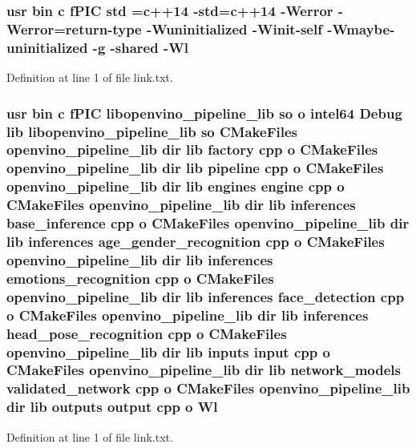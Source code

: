 \subsubsection[{\texorpdfstring{std}{std}}]{\setlength{\rightskip}{0pt plus 5cm}usr bin {\bf c} f\+P\+IC std ={\bf c}++14 -\/std={\bf c}++14 -\/Werror -\/Werror=return-\/type -\/Wuninitialized -\/Winit-\/self -\/Wmaybe-\/uninitialized -\/g -\/shared -\/{\bf Wl}}\hypertarget{CMakeFiles_2openvino__pipeline__lib_8dir_2link_8txt_a5f87c8f8e33670f7c8c5221b6be1bcc4}{}\label{CMakeFiles_2openvino__pipeline__lib_8dir_2link_8txt_a5f87c8f8e33670f7c8c5221b6be1bcc4}


Definition at line 1 of file link.\+txt.

\subsubsection[{\texorpdfstring{Wl}{Wl}}]{\setlength{\rightskip}{0pt plus 5cm}usr bin {\bf c} f\+P\+IC libopenvino\+\_\+pipeline\+\_\+lib {\bf so} o intel64 Debug lib libopenvino\+\_\+pipeline\+\_\+lib {\bf so} C\+Make\+Files {\bf openvino\+\_\+pipeline\+\_\+lib} dir lib factory cpp o C\+Make\+Files {\bf openvino\+\_\+pipeline\+\_\+lib} dir lib pipeline cpp o C\+Make\+Files {\bf openvino\+\_\+pipeline\+\_\+lib} dir lib engines engine cpp o C\+Make\+Files {\bf openvino\+\_\+pipeline\+\_\+lib} dir lib inferences base\+\_\+inference cpp o C\+Make\+Files {\bf openvino\+\_\+pipeline\+\_\+lib} dir lib inferences age\+\_\+gender\+\_\+recognition cpp o C\+Make\+Files {\bf openvino\+\_\+pipeline\+\_\+lib} dir lib inferences emotions\+\_\+recognition cpp o C\+Make\+Files {\bf openvino\+\_\+pipeline\+\_\+lib} dir lib inferences face\+\_\+detection cpp o C\+Make\+Files {\bf openvino\+\_\+pipeline\+\_\+lib} dir lib inferences head\+\_\+pose\+\_\+recognition cpp o C\+Make\+Files {\bf openvino\+\_\+pipeline\+\_\+lib} dir lib inputs input cpp o C\+Make\+Files {\bf openvino\+\_\+pipeline\+\_\+lib} dir lib network\+\_\+models validated\+\_\+network cpp o C\+Make\+Files {\bf openvino\+\_\+pipeline\+\_\+lib} dir lib outputs output cpp o Wl}\hypertarget{CMakeFiles_2openvino__pipeline__lib_8dir_2link_8txt_a5f884a9f2a1a718e40f017cc1683606c}{}\label{CMakeFiles_2openvino__pipeline__lib_8dir_2link_8txt_a5f884a9f2a1a718e40f017cc1683606c}


Definition at line 1 of file link.\+txt.


